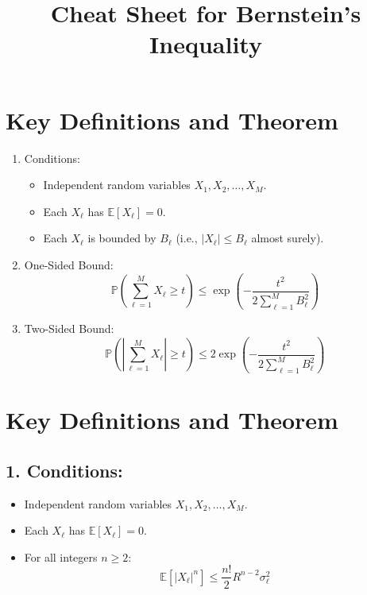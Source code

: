 \documentclass{article}
\begin{document}
\section*{Key Definitions and Theorem}

\begin{enumerate}
    \item Conditions:
    \begin{itemize}
        \item Independent random variables $X_1, X_2, \ldots, X_M$.
        \item Each $X_\ell$ has $\mathbb{E}[X_\ell] = 0$.
        \item Each $X_\ell$ is bounded by $B_\ell$ (i.e., $|X_\ell| \leq B_\ell$ almost surely).
    \end{itemize}

    \item One-Sided Bound:
    \[
    \mathbb{P}\left(\sum_{\ell=1}^{M} X_\ell \geq t\right) \leq \exp\left(-\frac{t^2}{2\sum_{\ell=1}^{M} B_\ell^2}\right)
    \]

    \item Two-Sided Bound:
    \[
    \mathbb{P}\left(\left|\sum_{\ell=1}^{M} X_\ell\right| \geq t\right) \leq 2 \exp\left(-\frac{t^2}{2\sum_{\ell=1}^{M} B_\ell^2}\right)
    \]
\end{enumerate}









\title{Cheat Sheet for Bernstein's Inequality}

\maketitle

\section*{Key Definitions and Theorem}

\subsection*{1. Conditions:}
\begin{itemize}[leftmargin=*]
    \item Independent random variables $X_1, X_2, \ldots, X_M$.
    \item Each $X_\ell$ has $\mathbb{E}[X_\ell] = 0$.
    \item For all integers $n \geq 2$:
    \[
    \mathbb{E}[|X_\ell|^n] \leq \frac{n!}{2} R^{n-2} \sigma_\ell^2
    \]
\end{itemize}
\end{document}
